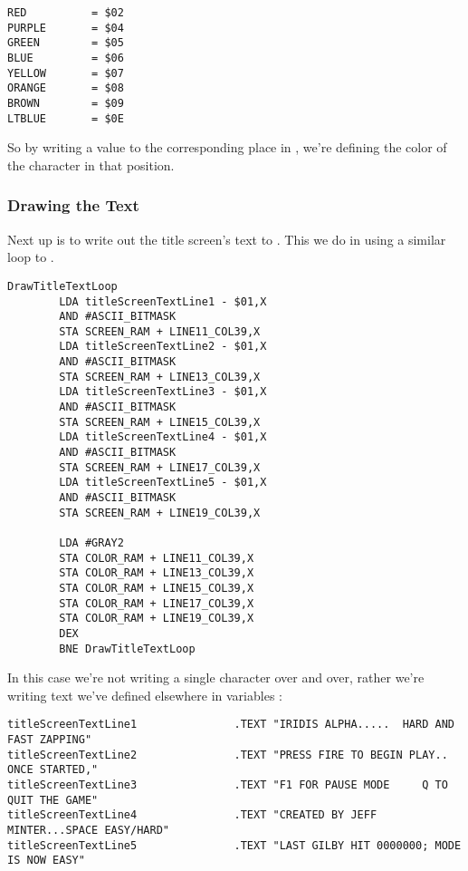 \begin{lstlisting}[caption=In \icode{DrawStripesBehindTitle}]
RED          = $02
PURPLE       = $04
GREEN        = $05
BLUE         = $06
YELLOW       = $07
ORANGE       = $08
BROWN        = $09
LTBLUE       = $0E
\end{lstlisting}

So by writing a value to the corresponding place in , we're defining the color of the character
in that position.



\subsubsection{Drawing the Text}

Next up is to write out the title screen's text to . This we do in 
using a similar loop to . 

\begin{lstlisting}[caption=In \icode{DrawTitleScreenText}]
DrawTitleTextLoop   
        LDA titleScreenTextLine1 - $01,X
        AND #ASCII_BITMASK
        STA SCREEN_RAM + LINE11_COL39,X
        LDA titleScreenTextLine2 - $01,X
        AND #ASCII_BITMASK
        STA SCREEN_RAM + LINE13_COL39,X
        LDA titleScreenTextLine3 - $01,X
        AND #ASCII_BITMASK
        STA SCREEN_RAM + LINE15_COL39,X
        LDA titleScreenTextLine4 - $01,X
        AND #ASCII_BITMASK
        STA SCREEN_RAM + LINE17_COL39,X
        LDA titleScreenTextLine5 - $01,X
        AND #ASCII_BITMASK
        STA SCREEN_RAM + LINE19_COL39,X

        LDA #GRAY2
        STA COLOR_RAM + LINE11_COL39,X
        STA COLOR_RAM + LINE13_COL39,X
        STA COLOR_RAM + LINE15_COL39,X
        STA COLOR_RAM + LINE17_COL39,X
        STA COLOR_RAM + LINE19_COL39,X
        DEX
        BNE DrawTitleTextLoop
\end{lstlisting}

In this case we're not writing a single character over and over, rather we're writing text we've defined elsewhere
in variables :

\begin{lstlisting}[basicstyle=\tiny,caption=In \icode{DrawTitleScreenText}]
titleScreenTextLine1               .TEXT "IRIDIS ALPHA.....  HARD AND FAST ZAPPING"
titleScreenTextLine2               .TEXT "PRESS FIRE TO BEGIN PLAY.. ONCE STARTED,"
titleScreenTextLine3               .TEXT "F1 FOR PAUSE MODE     Q TO QUIT THE GAME"
titleScreenTextLine4               .TEXT "CREATED BY JEFF MINTER...SPACE EASY/HARD"
titleScreenTextLine5               .TEXT "LAST GILBY HIT 0000000; MODE IS NOW EASY"
\end{lstlisting}


